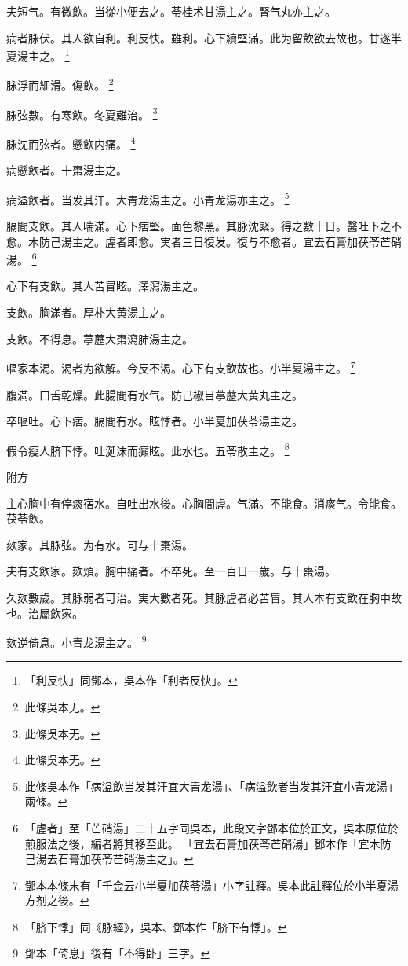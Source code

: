 夫短气。有微飲。当從小便去之。苓桂术甘湯主之。腎气丸亦主之。

病者脉伏。其人欲自利。利反快。雖利。心下續堅滿。此为留飲欲去故也。甘遂半夏湯主之。
	\footnote{
		「利反快」同鄧本，吳本作「利者反快」。
	}

脉浮而細滑。傷飲。
	\footnote{
		此條吳本无。
	}

脉弦數。有寒飲。冬夏難治。
	\footnote{
		此條吳本无。
	}

脉沈而弦者。懸飲内痛。
	\footnote{
		此條吳本无。
	}

病懸飲者。十棗湯主之。

病溢飲者。当发其汗。大青龙湯主之。小青龙湯亦主之。
	\footnote{
		此條吳本作「病溢飲当发其汗宜大青龙湯」、「病溢飲者当发其汗宜小青龙湯」兩條。
	}

膈間支飲。其人喘滿。心下痞堅。面色黎黑。其脉沈緊。得之數十日。醫吐下之不愈。木防己湯主之。虗者即愈。実者三日復发。復与不愈者。宜去石膏加茯苓芒硝湯。
	\footnote{
		「虗者」至「芒硝湯」二十五字同吳本，此段文字鄧本位於正文，吳本原位於煎服法之後，編者將其移至此。
		「宜去石膏加茯苓芒硝湯」鄧本作「宜木防己湯去石膏加茯苓芒硝湯主之」。
	}

心下有支飲。其人苦冒眩。澤瀉湯主之。

支飲。胸滿者。厚朴大黄湯主之。

支飲。不得息。葶藶大棗瀉肺湯主之。

嘔家本渴。渴者为欲解。今反不渴。心下有支飲故也。小半夏湯主之。
	\footnote{
		鄧本本條末有「千金云小半夏加茯苓湯」小字註釋。吳本此註釋位於小半夏湯方剂之後。
	}

腹滿。口舌乾燥。此腸間有水气。防己椒目葶藶大黄丸主之。

卒嘔吐。心下痞。膈間有水。眩悸者。小半夏加茯苓湯主之。

假令瘦人脐下悸。吐涎沫而癲眩。{\khaai 此}水也。五苓散主之。
	\footnote{
		「脐下悸」同《脉經》，吳本、鄧本作「脐下有悸」。
	}

附方

主心胸中有停痰宿水。自吐出水後。心胸間虗。气滿。不能食。消痰气。令能食。茯苓飲。

欬家。其脉弦。为有水。可与十棗湯。

夫有支飲家。欬煩。胸中痛者。不卒死。至一百日一歲。与十棗湯。

久欬數歲。其脉弱者可治。実大數者死。其脉虗者必苦冒。其人本有支飲在胸中故也。治屬飲家。

欬逆倚息。小青龙湯主之。
	\footnote{
		鄧本「倚息」後有「不得卧」三字。
	}
	
